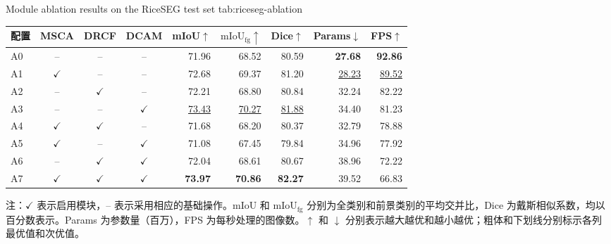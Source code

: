 \begin{table}[!htb]
  \centering
    {Module ablation results on the RiceSEG test set}
    {tab:riceseg-ablation}
  \begin{spacing}{1.2}
    \small
    \setlength{\tabcolsep}{2pt}
    \renewcommand{\arraystretch}{1.15}
    \begin{tabular*}{\linewidth}{@{\extracolsep{\fill}}lcccrrrrr@{}}
      \toprule
      配置 & MSCA & DRCF & DCAM
        & mIoU\(\uparrow\) & \(\mathrm{mIoU}_{\mathrm{fg}}\uparrow\)
        & Dice\(\uparrow\) & Params\(\downarrow\) & FPS\(\uparrow\) \\
      \midrule
      A0 & -- & -- & --
        & 71.96 & 68.52 & 80.59 & \textbf{27.68} & \textbf{92.86} \\
      A1 & \(\checkmark\) & -- & --
        & 72.68 & 69.37 & 81.20 & \underline{28.23} & \underline{89.52} \\
      A2 & -- & \(\checkmark\) & --
        & 72.21 & 68.80 & 80.84 & 32.24 & 82.22 \\
      A3 & -- & -- & \(\checkmark\)
        & \underline{73.43} & \underline{70.27} & \underline{81.88} & 34.40 & 81.23 \\
      A4 & \(\checkmark\) & \(\checkmark\) & --
        & 71.68 & 68.20 & 80.37 & 32.79 & 78.88 \\
      A5 & \(\checkmark\) & -- & \(\checkmark\)
        & 71.08 & 67.45 & 79.84 & 34.96 & 77.92 \\
      A6 & -- & \(\checkmark\) & \(\checkmark\)
        & 72.04 & 68.61 & 80.67 & 38.96 & 72.22 \\
      \midrule
      A7 & \(\checkmark\) & \(\checkmark\) & \(\checkmark\)
        & \textbf{73.97} & \textbf{70.86} & \textbf{82.27} & 39.52 & 66.83 \\
      \bottomrule
    \end{tabular*}
  \end{spacing}
  \par\vspace{8pt}
  \noindent\begin{minipage}{\linewidth}
    \normalfont{}\raggedright
    \noindent 注：\(\checkmark\) 表示启用模块，-- 表示采用相应的基础操作。mIoU 和 \(\mathrm{mIoU}_{\mathrm{fg}}\) 分别为全类别和前景类别的平均交并比，Dice 为戴斯相似系数，均以百分数表示。Params 为参数量（百万），FPS 为每秒处理的图像数。\(\uparrow\) 和 \(\downarrow\) 分别表示越大越优和越小越优；粗体和下划线分别标示各列最优值和次优值。\par

\end{minipage}
\end{table}
